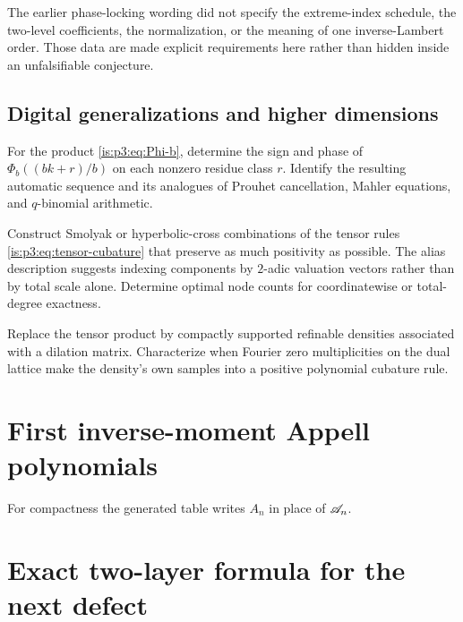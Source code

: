 The earlier phase-locking wording did not specify the extreme-index schedule,
the two-level coefficients, the normalization, or the meaning of one
inverse-Lambert order.  Those data are made explicit requirements here rather
than hidden inside an unfalsifiable conjecture.

\subsection{Digital generalizations and higher dimensions}

\begin{problem}
\label{is:p3:prob:base-b-signs}
For the product \eqref{is:p3:eq:Phi-b}, determine the sign and phase of $\Phi_b((bk+r)/b)$ on each nonzero residue class $r$.  Identify the resulting automatic sequence and its analogues of Prouhet cancellation, Mahler equations, and $q$-binomial arithmetic.
\end{problem}

\begin{problem}
\label{is:p3:prob:sparse-grid}
Construct Smolyak or hyperbolic-cross combinations of the tensor rules \eqref{is:p3:eq:tensor-cubature} that preserve as much positivity as possible.  The alias description suggests indexing components by $2$-adic valuation vectors rather than by total scale alone.  Determine optimal node counts for coordinatewise or total-degree exactness.
\end{problem}

\begin{problem}
\label{is:p3:prob:nonproduct-laws}
Replace the tensor product by compactly supported refinable densities associated with a dilation matrix.  Characterize when Fourier zero multiplicities on the dual lattice make the density's own samples into a positive polynomial cubature rule.
\end{problem}

\section{First inverse-moment Appell polynomials}
\label{is:p3:app:Appell-table}

For compactness the generated table writes $A_n$ in place of $\mathscr A_n$.


\section{Exact two-layer formula for the next defect}
\label{is:p3:app:next-defect}

